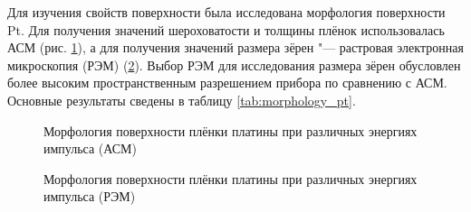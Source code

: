 Для изучения свойств поверхности была исследована морфология поверхности Pt. Для получения значений шероховатости и толщины плёнок использовалась АСМ (рис. \cref{fig:afm:morphology}), а для получения значений размера зёрен "--- растровая электронная микроскопия (РЭМ) (\cref{fig:sem:morphology}). Выбор РЭМ для исследования размера зёрен обусловлен более высоким пространственным разрешением прибора по сравнению с АСМ. Основные результаты сведены в таблицу \cref{tab:morphology_pt}.
\begin{figure}[ht]
    \caption[Этот текст попадает в названия рисунков в списке рисунков]{Морфология поверхности плёнки платины при различных энергиях импульса (АСМ)}\label{fig:afm:morphology}
\end{figure}

\begin{figure}[ht]
    \caption[Этот текст попадает в названия рисунков в списке рисунков]{Морфология поверхности плёнки платины при различных энергиях импульса (РЭМ)}\label{fig:sem:morphology}
\end{figure}

